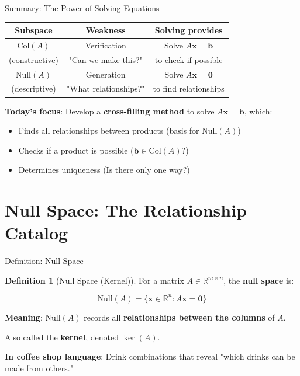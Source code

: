 \documentclass[10pt]{beamer}
\theoremstyle{definition}
\newtheorem{defi}{Definition}[section]
\newcommand{\x}[1]{\alert{\textbf{#1}}}
\begin{document}
\begin{frame}{Summary: The Power of Solving Equations}

\begin{center}
\begin{tabular}{|c|c|c|}
\hline
\textbf{Subspace} & \textbf{Weakness} & \textbf{Solving provides} \\
\hline
$\text{Col}(A)$ & Verification & Solve $A\mathbf{x}=\mathbf{b}$ \\
(constructive) & "Can we make this?" & to check if possible \\
\hline
$\text{Null}(A)$ & Generation & Solve $A\mathbf{x}=\mathbf{0}$ \\
(descriptive) & "What relationships?" & to find relationships \\
\hline
\end{tabular}
\end{center}

\vspace{1em}

\x{Today's focus}: Develop a \textbf{cross-filling method} to solve $A\mathbf{x} = \mathbf{b}$, which:

\begin{itemize}
\item Finds all relationships between products (basis for $\text{Null}(A)$)
\item Checks if a product is possible ($\mathbf{b} \in \text{Col}(A)$?)
\item Determines uniqueness (Is there only one way?)
\end{itemize}

\end{frame}

\section{Null Space: The Relationship Catalog}

\begin{frame}{Definition: Null Space}

\begin{defi}[Null Space (Kernel)]
For a matrix $A \in \mathbb{R}^{m \times n}$, the \x{null space} is:

$$\text{Null}(A) = \{\mathbf{x} \in \mathbb{R}^n : A\mathbf{x} = \mathbf{0}\}$$

\textbf{Meaning}: $\text{Null}(A)$ records all \x{relationships between the columns} of $A$.

Also called the \x{kernel}, denoted $\ker(A)$.
\end{defi}

\vspace{0.5em}

\x{In coffee shop language}: Drink combinations that reveal "which drinks can be made from others."

\end{frame}
\end{document}
